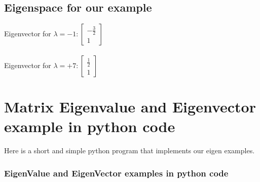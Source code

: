 \documentclass{article}
\begin{document}
\newpage
\subsection{Eigenspace for our example}
Eigenvector for
$ \lambda = -1 :  
\begin{bmatrix}
   - \frac{3}{2}    \\
    1      
\end{bmatrix}
$
\\
\\
Eigenvector for
$ \lambda = +7  :
\begin{bmatrix}
   \frac{1}{2}    \\
    1      
\end{bmatrix}
$


\newpage
\section{Matrix Eigenvalue and Eigenvector example in python code }
Here is a short and simple python program that implements our eigen examples.
\\
\subsubsection{EigenValue and EigenVector examples in python code}



\end{document}
